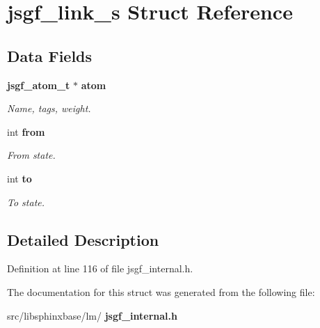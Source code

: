 \section{jsgf\+\_\+link\+\_\+s Struct Reference}
\label{structjsgf__link__s}
\subsection*{Data Fields}
\begin{DoxyCompactItemize}
\item 
\mbox{\label{structjsgf__link__s_a140a7cfbe76100928b9c7ea052435ca5}} 
\textbf{ jsgf\+\_\+atom\+\_\+t} $\ast$ \textbf{ atom}
\begin{DoxyCompactList}\small\item\em Name, tags, weight. \end{DoxyCompactList}\item 
\mbox{\label{structjsgf__link__s_a02f9b2bc3b98e802164e80d051923bb3}} 
int \textbf{ from}
\begin{DoxyCompactList}\small\item\em From state. \end{DoxyCompactList}\item 
\mbox{\label{structjsgf__link__s_a9da8ad9d87149f0cfca6ca815c581717}} 
int \textbf{ to}
\begin{DoxyCompactList}\small\item\em To state. \end{DoxyCompactList}\end{DoxyCompactItemize}


\subsection{Detailed Description}


Definition at line 116 of file jsgf\+\_\+internal.\+h.



The documentation for this struct was generated from the following file\+:\begin{DoxyCompactItemize}
\item 
src/libsphinxbase/lm/\textbf{ jsgf\+\_\+internal.\+h}\end{DoxyCompactItemize}
